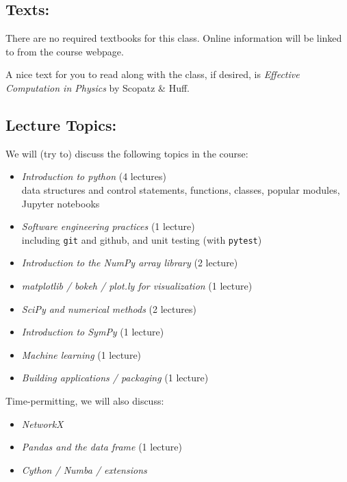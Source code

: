 \documentclass[10pt]{article}
\newenvironment{itemsquish}
  { \begin{itemize}
    \addtolength{\itemsep}{-0.25\baselineskip}
    \addtolength{\baselineskip}{-0.25\baselineskip} }
  { \end{itemize} }
\begin{document}
\subsection*{Texts:}

There are no required textbooks for this class.  Online information
will be linked to from the course webpage.

A nice text for you to read along with the class, if desired, is
{\em Effective Computation in Physics}\/ by Scopatz \& Huff.



\subsection*{Lecture Topics:}

We will (try to) discuss the following topics in the course:
%
\begin{itemsquish}
\item {\em Introduction to python} (4 lectures) \\ data structures and
  control statements, functions, classes, popular modules, Jupyter
  notebooks

\item {\em Software engineering practices} (1 lecture) \\
  including {\tt git} and github, and unit testing (with {\tt pytest})

\item {\em Introduction to the NumPy array library} (2 lecture)

\item {\em matplotlib / bokeh / plot.ly for visualization} (1 lecture)

\item {\em SciPy and numerical methods} (2 lectures)

\item {\em Introduction to SymPy} (1 lecture)

\item {\em Machine learning} (1 lecture)

\item {\em Building applications / packaging} (1 lecture)
\end{itemsquish}

\noindent Time-permitting, we will also discuss:
\begin{itemsquish}
\item {\em NetworkX}

\item {\em Pandas and the data frame} (1 lecture)


\item {\em Cython / Numba / extensions}

\end{itemsquish}
\end{document}
